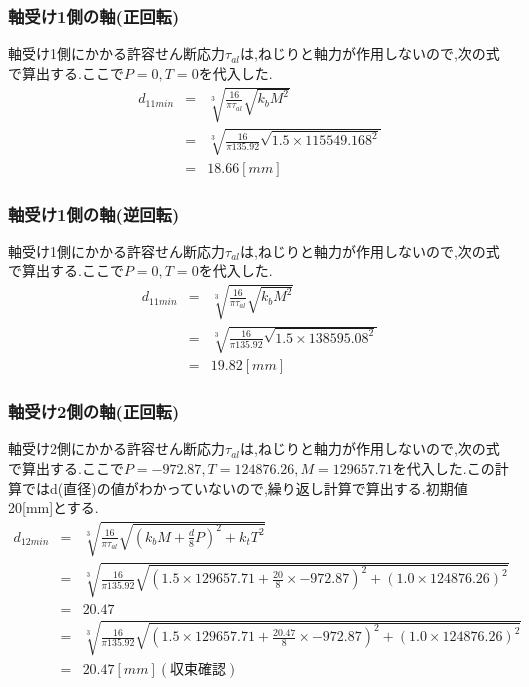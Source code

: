 \subsubsection{軸受け1側の軸(正回転)}
軸受け1側にかかる許容せん断応力$\tau_{al}$は,ねじりと軸力が作用しないので,次の式で算出する.ここで$P=0,T=0$を代入した.
\begin{eqnarray}
d_{11min} &=& \sqrt [3]{ \frac{16}{\pi \tau_{al}}\sqrt{k_bM^2} }\\
       &=& \sqrt [3]{ \frac{16}{\pi 135.92}\sqrt{1.5 \times 115549.168^2} }\\
       &=& 18.66[mm]
\end{eqnarray}
\subsubsection{軸受け1側の軸(逆回転)}
軸受け1側にかかる許容せん断応力$\tau_{al}$は,ねじりと軸力が作用しないので,次の式で算出する.ここで$P=0,T=0$を代入した.
\begin{eqnarray}
d_{11min} &=& \sqrt [3]{ \frac{16}{\pi \tau_{al}}\sqrt{k_bM^2} }\\
       &=& \sqrt [3]{ \frac{16}{\pi 135.92}\sqrt{1.5 \times 138595.08^2} }\\
       &=& 19.82[mm]
\end{eqnarray}
\subsubsection{軸受け2側の軸(正回転)}
軸受け2側にかかる許容せん断応力$\tau_{al}$は,ねじりと軸力が作用しないので,次の式で算出する.ここで$P=-972.87,T=124876.26, M=129657.71$を代入した.この計算ではd(直径)の値がわかっていないので,繰り返し計算で算出する.初期値20[mm]とする.
\begin{eqnarray}
d_{12min}&=& \sqrt [3]{ \frac{16}{\pi \tau_{al}}\sqrt{(k_bM+\frac{d}{8}P)^2+k_tT^2} }\\
       &=& \sqrt [3]{ \frac{16}{\pi 135.92} \sqrt{(1.5 \times 129657.71 +\frac{20}{8}\times -972.87)^2+(1.0 \times 124876.26)^2} }\\
       &=&20.47\\
       &=& \sqrt [3]{ \frac{16}{\pi 135.92} \sqrt{(1.5 \times 129657.71 +\frac{20.47}{8}\times -972.87)^2+(1.0 \times 124876.26)^2} }\\
       &=&20.47[mm](収束確認)
\end{eqnarray}
